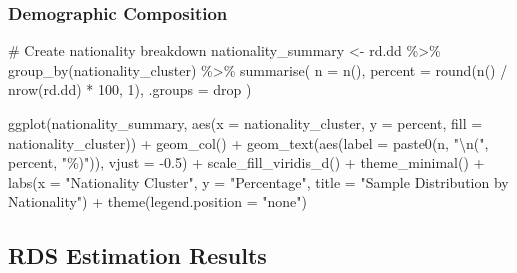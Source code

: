 \documentclass[
  12pt,
]{article}
\newenvironment{Shaded}{\begin{snugshade}}{\end{snugshade}}
\newcommand{\AttributeTok}[1]{\textcolor[rgb]{0.40,0.45,0.13}{#1}}
\newcommand{\CommentTok}[1]{\textcolor[rgb]{0.37,0.37,0.37}{#1}}
\newcommand{\DecValTok}[1]{\textcolor[rgb]{0.68,0.00,0.00}{#1}}
\newcommand{\FloatTok}[1]{\textcolor[rgb]{0.68,0.00,0.00}{#1}}
\newcommand{\FunctionTok}[1]{\textcolor[rgb]{0.28,0.35,0.67}{#1}}
\newcommand{\NormalTok}[1]{\textcolor[rgb]{0.00,0.23,0.31}{#1}}
\newcommand{\OtherTok}[1]{\textcolor[rgb]{0.00,0.23,0.31}{#1}}
\newcommand{\SpecialCharTok}[1]{\textcolor[rgb]{0.37,0.37,0.37}{#1}}
\newcommand{\StringTok}[1]{\textcolor[rgb]{0.13,0.47,0.30}{#1}}
\theoremstyle{plain}
\theoremstyle{definition}
\begin{document}
\subsubsection{Demographic Composition}\label{demographic-composition}

\begin{Shaded}
\begin{Highlighting}[]
\CommentTok{\# Create nationality breakdown}
\NormalTok{nationality\_summary }\OtherTok{\textless{}{-}}\NormalTok{ rd.dd }\SpecialCharTok{\%\textgreater{}\%}
  \FunctionTok{group\_by}\NormalTok{(nationality\_cluster) }\SpecialCharTok{\%\textgreater{}\%}
  \FunctionTok{summarise}\NormalTok{(}
    \AttributeTok{n =} \FunctionTok{n}\NormalTok{(),}
    \AttributeTok{percent =} \FunctionTok{round}\NormalTok{(}\FunctionTok{n}\NormalTok{() }\SpecialCharTok{/} \FunctionTok{nrow}\NormalTok{(rd.dd) }\SpecialCharTok{*} \DecValTok{100}\NormalTok{, }\DecValTok{1}\NormalTok{),}
    \AttributeTok{.groups =} \StringTok{\textquotesingle{}drop\textquotesingle{}}
\NormalTok{  )}

\FunctionTok{ggplot}\NormalTok{(nationality\_summary, }\FunctionTok{aes}\NormalTok{(}\AttributeTok{x =}\NormalTok{ nationality\_cluster, }\AttributeTok{y =}\NormalTok{ percent, }\AttributeTok{fill =}\NormalTok{ nationality\_cluster)) }\SpecialCharTok{+}
  \FunctionTok{geom\_col}\NormalTok{() }\SpecialCharTok{+}
  \FunctionTok{geom\_text}\NormalTok{(}\FunctionTok{aes}\NormalTok{(}\AttributeTok{label =} \FunctionTok{paste0}\NormalTok{(n, }\StringTok{"}\SpecialCharTok{\textbackslash{}n}\StringTok{("}\NormalTok{, percent, }\StringTok{"\%)"}\NormalTok{)), }\AttributeTok{vjust =} \SpecialCharTok{{-}}\FloatTok{0.5}\NormalTok{) }\SpecialCharTok{+}
  \FunctionTok{scale\_fill\_viridis\_d}\NormalTok{() }\SpecialCharTok{+}
  \FunctionTok{theme\_minimal}\NormalTok{() }\SpecialCharTok{+}
  \FunctionTok{labs}\NormalTok{(}\AttributeTok{x =} \StringTok{"Nationality Cluster"}\NormalTok{, }\AttributeTok{y =} \StringTok{"Percentage"}\NormalTok{, }
       \AttributeTok{title =} \StringTok{"Sample Distribution by Nationality"}\NormalTok{) }\SpecialCharTok{+}
  \FunctionTok{theme}\NormalTok{(}\AttributeTok{legend.position =} \StringTok{"none"}\NormalTok{)}
\end{Highlighting}
\end{Shaded}

\subsection{RDS Estimation Results}\label{rds-estimation-results}
\end{document}
